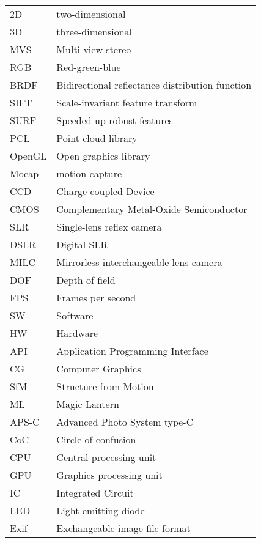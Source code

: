 \begin{tabular}{ll}
	2D & two-dimensional\\
	3D & three-dimensional\\
	MVS & Multi-view stereo\\
	RGB & Red-green-blue\\
	BRDF & Bidirectional reflectance distribution function\\
	SIFT & Scale-invariant feature transform\\
	SURF & Speeded up robust features \\
	PCL & Point cloud library\\
	OpenGL & Open graphics library\\
	Mocap & motion capture\\
	CCD & Charge-coupled Device\\
	CMOS & Complementary Metal-Oxide Semiconductor\\
	SLR & Single-lens reflex camera\\
	DSLR & Digital SLR\\
	MILC & Mirrorless interchangeable-lens camera\\
	DOF & Depth of field\\
	FPS & Frames per second\\
	SW & Software\\
	HW & Hardware\\
	API & Application Programming Interface\\
	CG & Computer Graphics\\
	SfM & Structure from Motion\\
	ML & Magic Lantern\\
	APS-C & Advanced Photo System type-C\\
	CoC & Circle of confusion\\
	CPU & Central processing unit\\
	GPU & Graphics processing unit\\
	IC & Integrated Circuit\\
	LED & Light-emitting diode\\
	Exif & Exchangeable image file format\\
\end{tabular}

